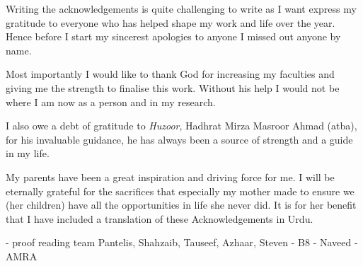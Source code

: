 Writing the acknowledgements is quite challenging to write as I want express my gratitude to everyone who has helped shape my work and life over the year. Hence before I start my sincerest apologies to anyone I missed out anyone by name.

Most importantly I would like to thank God for increasing my faculties and giving me the strength to finalise this work. Without his help I would not be where I am now as a person and in my research.

I also owe a debt of gratitude to \emph{Huzoor}, Hadhrat Mirza Masroor Ahmad (atba), for his invaluable guidance, he has always been a source of strength and a guide in my life.

My parents have been a great inspiration and driving force for me.  I will be eternally grateful for the sacrifices that especially my mother made to ensure we (her children)  have all the opportunities in life she never did. It is for her benefit that I have included a translation of these Acknowledgements in Urdu.


- proof reading team Pantelis, Shahzaib, Tauseef, Azhaar, Steven
- B8
- Naveed
- AMRA

